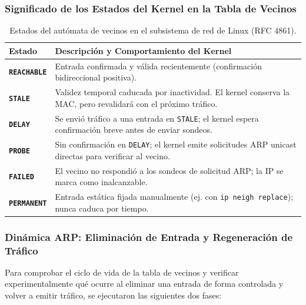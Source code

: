 \documentclass[11pt,a4paper]{article}
\begin{document}
\subsubsection{Significado de los Estados del Kernel en la Tabla de Vecinos}
\begin{table}[H]
    \centering
    \footnotesize
    \caption{Estados del autómata de vecinos en el subsistema de red de Linux (RFC 4861).}
    \label{tab:estados_arp}
    \begin{tabularx}{\textwidth}{lX}
        \toprule
        \rowcolor{tableheader}
        \textbf{Estado} & \textbf{Descripción y Comportamiento del Kernel} \\
        \midrule
        \textbf{\texttt{REACHABLE}} & Entrada confirmada y válida recientemente (confirmación bidireccional positiva). \\
        \rowcolor{rowalt}
        \textbf{\texttt{STALE}} & Validez temporal caducada por inactividad. El kernel conserva la MAC, pero revalidará con el próximo tráfico. \\
        \textbf{\texttt{DELAY}} & Se envió tráfico a una entrada en \texttt{STALE}; el kernel espera confirmación breve antes de enviar sondeos. \\
        \rowcolor{rowalt}
        \textbf{\texttt{PROBE}} & Sin confirmación en \texttt{DELAY}; el kernel emite solicitudes ARP unicast directas para verificar al vecino. \\
        \textbf{\texttt{FAILED}} & El vecino no respondió a los sondeos de solicitud ARP; la IP se marca como inalcanzable. \\
        \rowcolor{rowalt}
        \textbf{\texttt{PERMANENT}} & Entrada estática fijada manualmente (ej. con \texttt{ip neigh replace}); nunca caduca por tiempo. \\
        \bottomrule
    \end{tabularx}
\end{table}

\subsubsection{Dinámica ARP: Eliminación de Entrada y Regeneración de Tráfico}
Para comprobar el ciclo de vida de la tabla de vecinos y verificar experimentalmente qué ocurre al eliminar una entrada de forma controlada y volver a emitir tráfico, se ejecutaron las siguientes dos fases:
\end{document}
